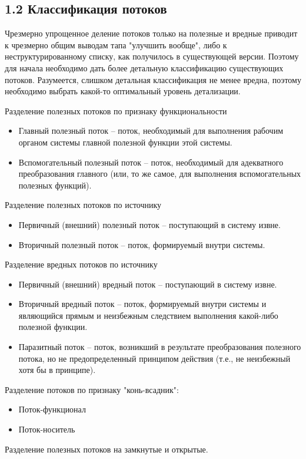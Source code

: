 \documentclass[a4paper,11pt]{article}
\begin{document}
\subsection{1.2 Классификация потоков}

Чрезмерно упрощенное деление потоков только на полезные и вредные приводит к
чрезмерно общим выводам тапа "улучшить вообще", либо к неструктурированному
списку, как получилось в существующей версии. Поэтому для начала необходимо
дать более детальную классификацию существующих потоков. Разумеется, слишком
детальная классификация не менее вредна, поэтому необходимо выбрать какой-то
оптимальный уровень детализации.

Разделение полезных потоков по признаку функциональности
\begin{itemize}
\item Главный полезный поток -- поток, необходимый для выполнения рабочим
  органом системы главной полезной функции этой системы.
\item Вспомогательный полезный поток -- поток, необходимый для адекватного
  преобразования главного (или, то же самое, для выполнения вспомогательных
  полезных функций).
\end{itemize}
Разделение полезных потоков по источнику
\begin{itemize}
\item Первичный (внешний) полезный поток -- поступающий в систему извне.
\item Вторичный полезный поток -- поток, формируемый внутри системы.
\end{itemize}
Разделение вредных потоков по источнику
\begin{itemize}
\item Первичный (внешний) вредный поток -- поступающий в систему извне.
\item Вторичный вредный поток -- поток, формируемый внутри системы и
  являющийся прямым и неизбежным следствием выполнения какой-либо полезной
  функции.
\item Паразитный поток -- поток, возникший в результате преобразования
  полезного потока, но не предопределенный принципом действия (т.е., не
  неизбежный хотя бы в принципе).
\end{itemize}
Разделение потоков по признаку "конь-всадник":
\begin{itemize}
\item Поток-функционал
\item Поток-носитель
\end{itemize}
Разделение полезных потоков на замкнутые и открытые.
\end{document}
